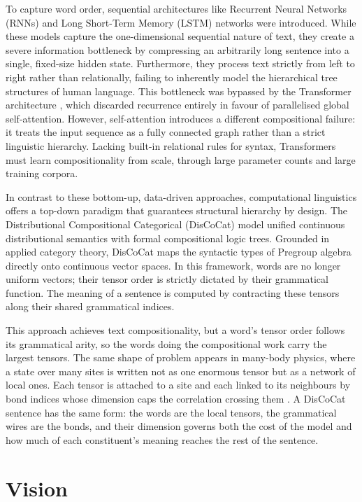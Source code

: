 \documentclass[12pt, a4paper, oneside]{report}
\begin{document}
To capture word order, sequential architectures like Recurrent Neural Networks (RNNs) \cite{rnn} and Long Short-Term Memory (LSTM) \cite{lstm} networks were introduced. While these models capture the one-dimensional sequential nature of text, they create a severe information bottleneck by compressing an arbitrarily long sentence into a single, fixed-size hidden state. Furthermore, they process text strictly from left to right rather than relationally, failing to inherently model the hierarchical tree structures of human language. This bottleneck was bypassed by the Transformer architecture \cite{attention}, which discarded recurrence entirely in favour of parallelised global self-attention. However, self-attention introduces a different compositional failure: it treats the input sequence as a fully connected graph rather than a strict linguistic hierarchy. Lacking built-in relational rules for syntax, Transformers must learn compositionality from scale, through large parameter counts and large training corpora.

In contrast to these bottom-up, data-driven approaches, computational linguistics offers a top-down paradigm that guarantees structural hierarchy by design. The Distributional Compositional Categorical (DisCoCat) model \cite{discocat} unified continuous distributional semantics with formal compositional logic trees. Grounded in applied category theory, DisCoCat maps the syntactic types of Pregroup algebra \cite{pregroup} directly onto continuous vector spaces. In this framework, words are no longer uniform vectors; their tensor order is strictly dictated by their grammatical function. The meaning of a sentence is computed by contracting these tensors along their shared grammatical indices.

This approach achieves text compositionality, but a word's tensor order follows its grammatical arity, so the words doing the compositional work carry the largest tensors. The same shape of problem appears in many-body physics, where a state over many sites is written not as one enormous tensor but as a network of local ones. Each tensor is attached to a site and each linked to its neighbours by bond indices whose dimension caps the correlation crossing them \cite{mps_physics}. A DisCoCat sentence has the same form: the words are the local tensors, the grammatical wires are the bonds, and their dimension governs both the cost of the model and how much of each constituent's meaning reaches the rest of the sentence.

\section{Vision}
\end{document}
